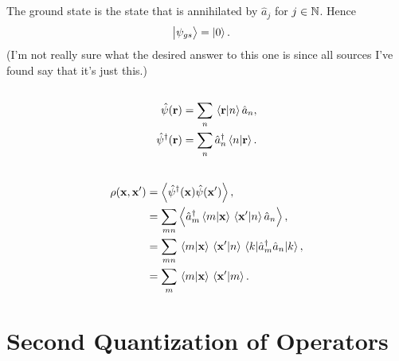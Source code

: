 \documentclass[
a4paper,
10pt,
twoside,
]{article}
\begin{document}
\subsection{}\label{ssec: IIIB}

The ground state is the state that is annihilated by $\hat{a}_j$ for $j \in \mathbb{N}$.
Hence
\begin{align}
	\ket{\psi_{gs}} &= \ket{0}.
\end{align}
(I'm not really sure what the desired answer to this one is since all sources I've found say that 
it's just this.)


\subsection{}\label{ssec: IIIC}


\begin{align}
	\hat{\psi}(\vb{r}) &= \sum_n \ip*{\vb{r}}{n}\hat{a}_n,\\
	\hat{\psi}^\dagger(\vb{r}) &= \sum_n \hat{a}_n^\dagger \ip*{n}{\vb{r}}.
\end{align}


\subsection{}\label{ssec: IIID}


\begin{align}
	\rho(\vb{x},\vb{x}')
		&= \ev{\hat{\psi}^\dagger(\vb{x})\hat{\psi}(\vb{x}')},\\
		&= \sum_{mn}\ev{\hat{a}_m^\dagger \ip*{m}{\vb{x}}\ip*{\vb{x}'}{n}\hat{a}_n},\\
		&= \sum_{mn}\ip*{m}{\vb{x}}\ip*{\vb{x}'}{n} \ev{\hat{a}_m^\dagger \hat{a}_n}{k},\\
		&= \sum_m \ip*{m}{\vb{x}}\ip*{\vb{x}'}{m}.
\end{align}


\section{Second Quantization of Operators}\label{sec: IIII}
\subsection{}\label{ssec: IIIIA}
\end{document}
